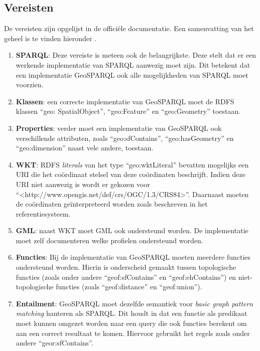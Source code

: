 \subsection{Vereisten}
De vereisten zijn opgelijst in de officiële documentatie. Een samenvatting van het geheel is te vinden hieronder \cite{ogcdocs}. 
\begin{enumerate}
    \item \textbf{SPARQL}: Deze vereiste is meteen ook de belangrijkste. Deze stelt dat er een werkende implementatie van SPARQL aanwezig moet zijn. Dit betekent dat een implementatie GeoSPARQL ook alle mogelijkheden van SPARQL moet voorzien.
    \item \textbf{Klassen}: een correcte implementatie van GeoSPARQL moet de RDFS klassen ``geo: SpatialObject'', ``geo:Feature'' en ``geo:Geometry'' toestaan.
    \item \textbf{Properties}: verder moet een implementatie van GeoSPARQL ook verschillende attributen, zoals ``geo:sfContains'', ``geo:hasGeometry'' en ``geo:dimension'' naast vele andere, toestaan.
    \item \textbf{WKT}: RDFS \textit{literals} van het type ``geo:wktLiteral'' bevatten mogelijks een URI die het coördinaat stelsel van deze coördinaten beschrijft. Indien deze URI niet aanwezig is wordt er gekozen voor ``<http://www.opengis.net/def/crs/OGC/1.3/CRS84>''. Daarnaast moeten de coördinaten geïnterpreteerd worden zoals beschreven in het referentiesysteem.
    \item \textbf{GML}: naast WKT moet GML ook ondersteund worden. De implementatie moet zelf documenteren welke profielen ondersteund worden.
    \item \textbf{Functies}: Bij de implementatie van GeoSPARQL moeten meerdere functies ondersteund worden. Hierin is onderscheid gemaakt tussen topologische functies (zoals onder andere ``geof:sfContains'' en ``geof:ehContains'') en niet-topologische functies (zoals ``geof:distance'' en ``geof:union'').
    \item \textbf{Entailment}: GeoSPARQL moet dezelfde semantiek voor \textit{basic graph pattern matching} hanteren als SPARQL. Dit houdt in dat een functie als predikaat moet kunnen omgezet worden naar een query die ook functies berekent om aan een correct resultaat te komen. Hiervoor gebruikt het regels zoals onder andere ``geor:sfContains''.
\end{enumerate}

